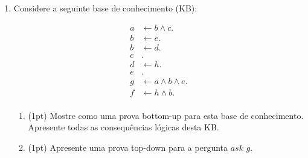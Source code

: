 \documentclass{article}
\begin{document}
\begin{enumerate}
\begin{enumerate}
        
    \end{enumerate}
    
    \pagebreak

    \item Considere a seguinte base de conhecimento (KB):
    
    \begin{center}
        \begin{align*}
         a & \leftarrow b \wedge c. \\ 
         b & \leftarrow e. \\ 
         b & \leftarrow d. \\ 
         c &. \\ 
         d & \leftarrow h. \\ 
         e &. \\
         g & \leftarrow a \wedge b  \wedge e. \\
         f & \leftarrow h \wedge b. \\  
        \end{align*}
    \end{center}
    
    
    \begin{enumerate}
        \item (1pt) Mostre como uma prova bottom-up para esta base de conhecimento. Apresente todas as consequências lógicas desta KB.
        
        
        \item (1pt) Apresente uma prova top-down para a pergunta $ask$ $g$.
        
        
    \end{enumerate}
    
\end{enumerate}




\end{document}
